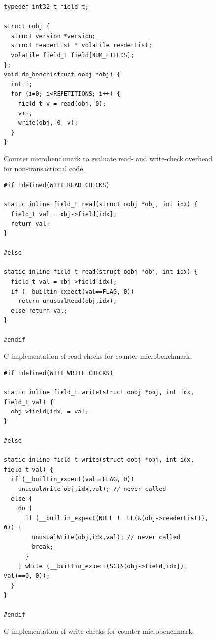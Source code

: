\begin{figure}
\sis\fontsize{9}{10}\begin{verbatim}
typedef int32_t field_t;

struct oobj {
  struct version *version;
  struct readerList * volatile readerList;
  volatile field_t field[NUM_FIELDS];
};
void do_bench(struct oobj *obj) {
  int i;
  for (i=0; i<REPETITIONS; i++) {
    field_t v = read(obj, 0);
    v++;
    write(obj, 0, v);
  }
}
\end{verbatim}
\caption{Counter microbenchmark to evaluate read- and write-check
  overhead for non-transactional code.}
\label{fig:counter-bench}
\end{figure}

\begin{figure}
\sis\fontsize{9}{10}\begin{verbatim}
#if !defined(WITH_READ_CHECKS)

static inline field_t read(struct oobj *obj, int idx) {
  field_t val = obj->field[idx];
  return val;
}

#else

static inline field_t read(struct oobj *obj, int idx) {
  field_t val = obj->field[idx];
  if (__builtin_expect(val==FLAG, 0))
    return unusualRead(obj,idx);
  else return val;
}

#endif
\end{verbatim}
\caption{C implementation of read checks for counter microbenchmark.}
\label{fig:counter-read}
\end{figure}

\begin{figure}
\sis\fontsize{9}{10}\begin{verbatim}
#if !defined(WITH_WRITE_CHECKS)

static inline field_t write(struct oobj *obj, int idx, field_t val) {
  obj->field[idx] = val;
}

#else

static inline field_t write(struct oobj *obj, int idx, field_t val) {
  if (__builtin_expect(val==FLAG, 0))
    unusualWrite(obj,idx,val); // never called
  else {
    do {
      if (__builtin_expect(NULL != LL(&(obj->readerList)), 0)) {
        unusualWrite(obj,idx,val); // never called
        break;
      }
    } while (__builtin_expect(SC(&(obj->field[idx]), val)==0, 0));
  }
}

#endif
\end{verbatim}
\caption{C implementation of write checks for counter microbenchmark.}
\label{fig:counter-write}
\end{figure}

